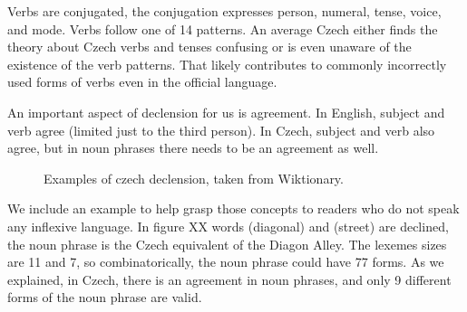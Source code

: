 Verbs are conjugated, the conjugation expresses person, numeral, tense, voice, and mode. Verbs follow one of 14 patterns. An average Czech either finds the theory about Czech verbs and tenses confusing or is even unaware of the existence of the verb patterns. That likely contributes to commonly incorrectly used forms of verbs even in the official language.

An important aspect of declension for us is agreement. In English, subject and verb agree (limited just to the third person). In Czech, subject and verb also agree, but in noun phrases there needs to be an agreement as well. 


\begin{figure}
\centering
{}
{}
\label{obr:pricnaUlice}
\caption{Examples of czech declension, taken from Wiktionary.}
\end{figure}

We include an example to help grasp those concepts to readers who do not speak any inflexive language. In figure XX words  (diagonal) and  (street) are declined, the noun phrase  is the Czech equivalent of the Diagon Alley. The lexemes sizes are 11 and 7, so combinatorically, the noun phrase could have 77 forms. As we explained, in Czech, there is an agreement in noun phrases, and only 9 different forms of the noun phrase  are valid. 

 

